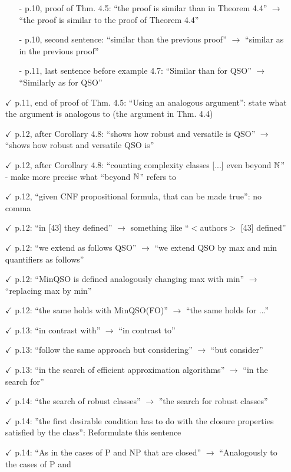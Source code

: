 \documentclass[a4paper]{article}
\begin{document}
\begin{itemize}
\begin{itemize}
	\item[-] p.10, proof of Thm. 4.5: ``the proof is similar than in Theorem 4.4'' $\to$ ``the proof is
	similar to the proof of Theorem 4.4''	
	\item[-] p.10, second sentence: ``similar than the previous proof'' $\to$ ``similar as in the previous
	proof''
	\item[-] p.11, last sentence before example 4.7: ``Similar than for QSO'' $\to$ ``Similarly as for QSO''
	\end{itemize}
	\item[$\checkmark$] p.11, end of proof of Thm. 4.5: ``Using an analogous argument'': state what the argument is
	analogous to (the argument in Thm. 4.4)
	\item[$\checkmark$] p.12, after Corollary 4.8: ``shows how robust and versatile is QSO'' $\to$ ``shows how robust and
	versatile QSO is''
	\item[$\checkmark$] p.12, after Corollary 4.8: ``counting complexity classes [...] even beyond $\mathbb{N}$'' - make more precise
	what ``beyond $\mathbb{N}$'' refers to
	\item[$\checkmark$] p.12, ``given CNF propositional formula, that can be made true'': no comma
	\item[$\checkmark$] p.12: ``in [43] they defined'' $\to$ something like ``$<$authors$>$ [43] defined''
	\item[$\checkmark$] p.12: ``we extend as follows QSO'' $\to$ ``we extend QSO by max and min quantifiers as follows''
	\item[$\checkmark$] p.12: ``MinQSO is defined analogously changing max with min'' $\to$ ``replacing max by min''
	\item[$\checkmark$] p.12: ``the same holds with MinQSO(FO)'' $\to$ ``the same holds for ...''
	\item[$\checkmark$] p.13: ``in contrast with'' $\to$ ``in contrast to''
	\item[$\checkmark$] p.13: ``follow the same approach but considering'' $\to$ ``but consider''
	\item[$\checkmark$] p.13: ``in the search of efficient approximation algorithms'' $\to$ ``in the search for''
	\item[$\checkmark$] p.14: ``the search of robust classes'' $\to$ ''the search for robust classes''
	\item[$\checkmark$] p.14: ''the first desirable condition has to do with the closure properties satisfied by the class'':
	Reformulate this sentence
	\item[$\checkmark$] p.14: ``As in the cases of P and NP that are closed'' $\to$ ``Analogously to the cases of P and

\end{itemize}
\end{document}
